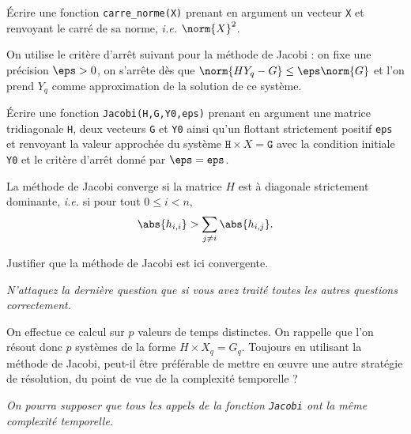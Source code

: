 \medskip{}

\question{} Écrire une fonction \texttt{carre\_norme(X)} prenant en argument un vecteur \texttt{X} et renvoyant le carré de sa norme, \emph{i.e.} $\norm{X}^2$.

\medskip{}

On utilise le critère d'arrêt suivant pour la méthode de Jacobi : on fixe une précision $\eps>0$, on s'arrête dès que $\norm{HY_q - G} \leq \eps \norm{G}$ et l'on prend $Y_q$ comme approximation de la solution de ce système.

\medskip{}

\question{} Écrire une fonction \texttt{Jacobi(H,G,Y0,eps)} prenant en argument une matrice tridiagonale \texttt{H}, deux vecteurs \texttt{G} et \texttt{Y0} ainsi qu'un flottant strictement positif \texttt{eps} et renvoyant la valeur approchée du système $\texttt{H} \times X = \texttt{G}$ avec la condition initiale \texttt{Y0} et le critère d'arrêt donné par $\eps = \texttt{eps}$.

\medskip{}

La méthode de Jacobi converge si la matrice $H$ est à diagonale strictement dominante, \emph{i.e.} si pour tout $0 \leq i < n$, 
\begin{equation*}
  \abs{h_{i,i}} > \sum_{j\neq i} \abs{h_{i,j}}.
\end{equation*}

\medskip{}

\question{} Justifier que la méthode de Jacobi est ici convergente.

\medskip{}

\emph{N'attaquez la dernière question que si vous avez traité toutes les autres questions correctement.}

\question{} On effectue ce calcul sur $p$ valeurs de temps distinctes. On rappelle que l'on résout donc $p$ systèmes de la forme $H \times X_q = G_q$. Toujours en utilisant la méthode de Jacobi, peut-il être préférable de mettre en {\oe}uvre une autre stratégie de résolution, du point de vue de la complexité temporelle ?

\emph{On pourra supposer que tous les appels de la fonction \texttt{Jacobi} ont la même complexité temporelle.}